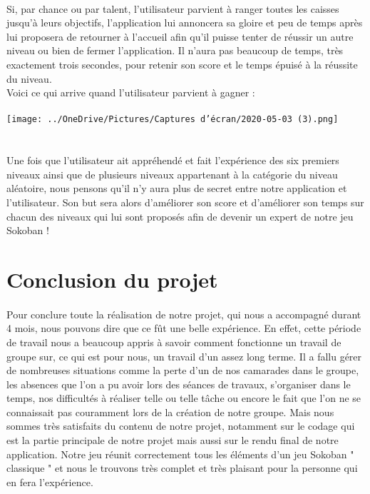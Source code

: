 \documentclass{article}
\begin{document}
\\
Si, par chance ou par talent, l'utilisateur parvient à ranger toutes les caisses jusqu'à leurs objectifs, l'application lui annoncera sa gloire et peu de temps après lui proposera de retourner à l'accueil afin qu'il puisse tenter de réussir un autre niveau ou bien de fermer l'application. Il n'aura pas beaucoup de temps, très exactement trois secondes, pour retenir son score et le temps épuisé à la réussite du niveau. \\
Voici ce qui arrive quand l'utilisateur parvient à gagner : 
\\
\\
\texttt{[image: ../OneDrive/Pictures/Captures d’écran/2020-05-03 (3).png]} 
\\
\\
\\
Une fois que l'utilisateur ait appréhendé et fait l'expérience des six premiers niveaux ainsi que de plusieurs niveaux appartenant à la catégorie du niveau aléatoire, nous pensons qu'il n'y aura plus de secret entre notre application et l'utilisateur. Son but sera alors d'améliorer son score et d'améliorer  son temps sur chacun des niveaux qui lui sont proposés afin de devenir un expert de notre jeu Sokoban ! 
\section{Conclusion du projet}
\paragraph{} Pour conclure toute la réalisation de notre projet, qui nous a accompagné durant 4 mois, nous pouvons dire que ce fût une belle expérience. En effet, cette période de travail nous a beaucoup appris à savoir comment fonctionne un travail de groupe sur, ce qui est pour nous, un travail d'un assez long terme. Il a fallu gérer de nombreuses situations comme la perte d'un de nos camarades dans le groupe, les absences que l'on a pu avoir lors des séances de travaux, s'organiser dans le temps, nos difficultés à réaliser telle ou telle tâche ou encore le fait que l'on ne se connaissait pas couramment lors de la création de notre groupe. Mais nous sommes très satisfaits du contenu de notre projet, notamment sur le codage qui est la partie principale de notre projet mais aussi sur le rendu final de notre application. Notre jeu réunit correctement tous les éléments d'un jeu Sokoban " classique " et nous le trouvons très complet et très plaisant pour la personne qui en fera l'expérience.
\end{document}
